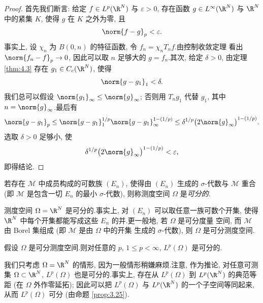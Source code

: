 \begin{proof}
首先我们断言: 给定 $f\in L^p(\R^N)$ 与 $\varepsilon>0$, 存在函数
$g\in L^\infty(\R^N)$ 与 $\R^N$ 中的紧集 $K$, 使得 $g$ 在 $K$ 之外为零, 且
\begin{equation}
\norm{f-g}_p<\varepsilon.
\label{eq:4.11}
\end{equation}
事实上, 设 $\chi_n$ 为 $B(0,n)$ 的特征函数, 令 $f_n=\chi_nT_nf$.由控制收敛定理
看出 $\norm{f_n-f}_p\to0$, 因此可以取 $n$ 足够大的 $g=f_n$.其次, 给定
$\delta>0$, 由定理  \ref{thm:4.3} 存在 $g_1\in C_c(\R^N)$, 使得
\begin{equation*}
\norm{g-g_1}_1<\delta.
\end{equation*}
我们总可以假设 $\norm{g_1}_\infty\le\norm{g}_\infty$; 否则用 $T_ng_1$ 代替
$g_1$, 其中 $n=\norm{g}_\infty$.最后有
\begin{equation*}
\norm{g-g_1}_p\le\norm{g-g_1}_1^{1/p}\norm{g-g_1}_\infty^{1-(1/p)}
\le\delta^{1/p}\bigl(2\norm{g}_\infty\bigr)^{1-(1/p)}.
\end{equation*}
选取 $\delta>0$ 足够小, 使
\begin{equation*}
\delta^{1/p}\bigl(2\norm{g}_\infty\bigr)^{1-(1/p)}<\varepsilon,
\end{equation*}
即得结论.
\end{proof}

\begin{definition}
若存在 $\mathcal{M}$ 中成员构成的可数族 $(E_n)$, 使得由 $(E_n)$ 生成的
$\sigma$-代数与 $\mathcal{M}$ 重合 (即 $\mathcal{M}$ 是包含一切 $E_n$ 的最小
$\sigma$-代数), 则称测度空间 $\Omega$ 是\emph{可分的}.
\end{definition}

\begin{example}
测度空间 $\Omega=\R^N$ 是可分的.事实上, 对 $(E_n)$ 可以取任意一族可数个开集,
使得 $\R^N$ 中每个开集都能写成这些 $E_n$ 的并.更一般地, 若 $\Omega$ 是可分度量
空间, 而 $\mathcal{M}$ 由 Borel 集组成 (即 $\mathcal{M}$ 是由 $\Omega$ 中的开集
生成的 $\sigma$-代数), 则 $\Omega$ 是可分测度空间.
\end{example}

\begin{theorem}
\label{thm:4.13}
假设 $\Omega$ 是可分测度空间.则对任意的 $p$, $1\le p<\infty$,
$L^p(\Omega)$ 是可分的.
\end{theorem}

我们只考虑 $\Omega=\R^N$ 的情形, 因为一般情形稍嫌麻烦.注意, 作为推论,
对任意可测集 $\Omega\subset\R^N$, $L^p(\Omega)$ 也是可分的.事实上, 存在从
$L^p(\Omega)$ 到 $L^p(\R^N)$ 的典范等距 (在 $\Omega$ 外作零延拓); 因此可以把
$L^p(\Omega)$ 与 $L^p(\R^N)$ 的一个子空间等同起来, 从而 $L^p(\Omega)$ 可分
(由命题  \ref{prop:3.25}).

